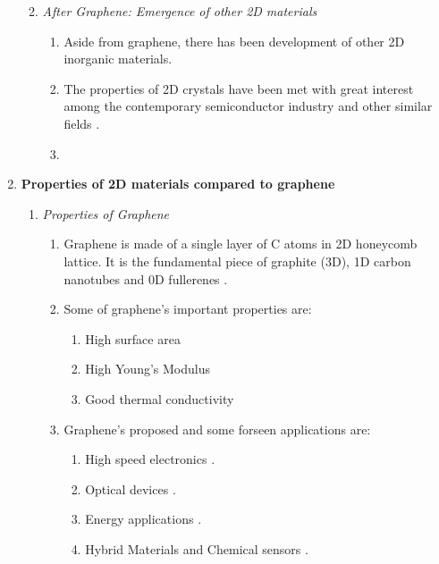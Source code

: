 \documentclass{article}
\begin{document}
\begin{enumerate}
\begin{enumerate}
\begin{enumerate}
			\end{enumerate}	%
		\item{\textit{After Graphene: Emergence of other 2D materials}}
			\begin{enumerate} %

				\item{Aside from graphene, there has been development of other 2D inorganic materials.}

				\item{The properties of 2D crystals have been met with great interest among the contemporary semiconductor industry and other similar fields \cite{2DflexibleNanoElectronics2014}.}

				\item{}
			\end{enumerate} %
	\end{enumerate} %

	\item{\textbf{Properties of 2D materials compared to graphene}}
		\begin{enumerate} %
			\item{\textit{Properties of Graphene}}
				\begin{enumerate} %

					\item{Graphene is made of a single layer of $\mathrm{C}$ atoms in 2D honeycomb lattice. It is the fundamental piece of graphite (3D), 1D carbon nanotubes and 0D fullerenes \cite{grapheneLike2Dreview2013}.}
					\item{Some of graphene's important properties are:}
						\begin{enumerate}
								\item{High surface area \cite{grapheneLike2Dreview2013}}
								\item{High Young's Modulus \cite{grapheneLike2Dreview2013}}
								\item{Good thermal conductivity}
						\end{enumerate}
				\item{Graphene's proposed and some forseen applications are:}
						\begin{enumerate}
							\item{High speed electronics \cite{LinGraphene2010}.}
							\item{Optical devices \cite{LiuOpticalGraphene2011}.}
							\item{Energy applications \cite{LiuOpticalGraphene2011, EnergyGraphene2009, ZhuEnergy2011}.}
							\item{Hybrid Materials and Chemical sensors \cite{LiuOpticalGraphene2011, El-Kady2012, XiYang2011, Giem2007}.}
						\end{enumerate}
				\end{enumerate} %


\end{enumerate}
\end{enumerate}
\end{document}
